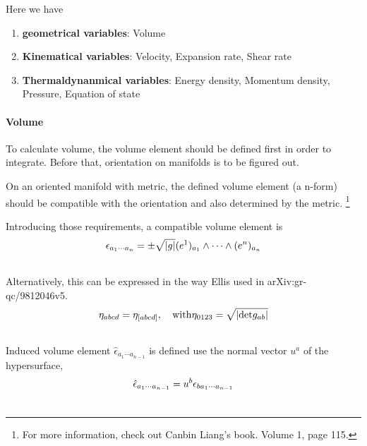 \documentclass[letterpaper,10pt,english]{sphinxmanual}
\begin{document}
Here we have
\begin{enumerate}
\item {} 
\textbf{geometrical variables}: Volume

\item {} 
\textbf{Kinematical variables}: Velocity, Expansion rate, Shear rate

\item {} 
\textbf{Thermaldynanmical variables}: Energy density, Momentum density, Pressure, Equation of state

\end{enumerate}


\paragraph{Volume}
\label{relativity/GeneralRelativity:volume}
To calculate volume, the volume element should be defined first in order to integrate. Before that, orientation on manifolds is to be figured out.

On an oriented manifold with metric, the defined volume element (a n-form) should be compatible with the orientation and also determined by the metric. \footnote{
For more information, check out Canbin Liang's book. Volume 1, page 115.
}

Introducing those requirements, a compatible volume element is
\begin{gather}
\begin{split}\epsilon_{a_1\cdots a_n} = \pm \sqrt{|g|} (e^1)_{a_1}\wedge \cdots \wedge (e^n)_{a_n}\end{split}\notag\\\begin{split}\end{split}\notag
\end{gather}
Alternatively, this can be expressed in the way Ellis used in arXiv:gr-qc/9812046v5.
\begin{gather}
\begin{split}\eta_{abcd} = \eta_{[abcd]}, \quad \mathrm{with} \eta_{0123} = \sqrt{|\mathrm {det} g_{ab}|}\end{split}\notag\\\begin{split}\end{split}\notag
\end{gather}
Induced volume element $\hat \epsilon_{a_1\cdots a_{n-1}}$ is defined use the normal vector $u^a$ of the hypersurface,
\begin{gather}
\begin{split}\hat \epsilon_{a_1\cdots a_{n-1}} = u^b \epsilon_{b a_1 \cdots a_{n-1}}\end{split}\notag\\\begin{split}\end{split}\notag
\end{gather}
\end{document}
